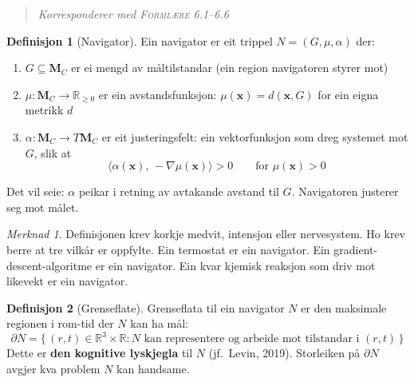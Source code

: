 \documentclass[11pt, a4paper]{article}
\theoremstyle{definition}
\newtheorem{defn}{Definisjon}[section]
\theoremstyle{plain}
\theoremstyle{remark}
\newtheorem*{merknad}{Merknad}
\newcommand{\MC}{\mathbf{M}_C}
\newcommand{\x}{\mathbf{x}}
\newcommand{\Reals}{\mathbb{R}}
\newcommand{\formlaere}{\textsc{Forml\ae re}}
\begin{document}
\begin{quote}
\itshape Korresponderer med \formlaere{} 6.1--6.6
\end{quote}

\begin{defn}[Navigator]
\label{def:navigator}
Ein navigator er eit trippel $N = (G, \mu, \alpha)$ der:
\begin{enumerate}[label=(\alph*)]
  \item $G \subseteq \MC$ er ei mengd av m\aa ltilstandar (ein region navigatoren styrer mot)
  \item $\mu : \MC \to \Reals_{\ge 0}$ er ein avstandsfunksjon:
        $\mu(\x) = d(\x, G)$ for ein eigna metrikk $d$
  \item $\alpha : \MC \to T\MC$ er eit justeringsfelt: ein vektorfunksjon som dreg
        systemet mot $G$, slik at
        \[
          \langle \alpha(\x),\, -\nabla\mu(\x) \rangle > 0
          \qquad \text{for } \mu(\x) > 0
        \]
\end{enumerate}
Det vil seie: $\alpha$ peikar i retning av avtakande avstand til $G$.
Navigatoren justerer seg mot m\aa let.
\end{defn}

\begin{merknad}
Definisjonen krev korkje medvit, intensjon eller nervesystem.
Ho krev berre at tre vilk\aa r er oppfylte.
Ein termostat er ein navigator.
Ein gradient-descent-algoritme er ein navigator.
Ein kvar kjemisk reaksjon som driv mot likevekt er ein navigator.
\end{merknad}

\begin{defn}[Grenseflate]
\label{def:grenseflate}
Grenseflata til ein navigator $N$ er den maksimale regionen i rom-tid der $N$
kan ha m\aa l:
\[
  \partial N = \bigl\{\,(r, t) \in \Reals^3 \times \Reals :
  N \text{ kan representere og arbeide mot tilstandar i } (r, t)\,\bigr\}
\]
Dette er \textbf{den kognitive lyskjegla} til $N$ (jf.\ Levin, 2019).
Storleiken p\aa{} $\partial N$ avgjer kva problem $N$ kan handsame.
\end{defn}
\end{document}
